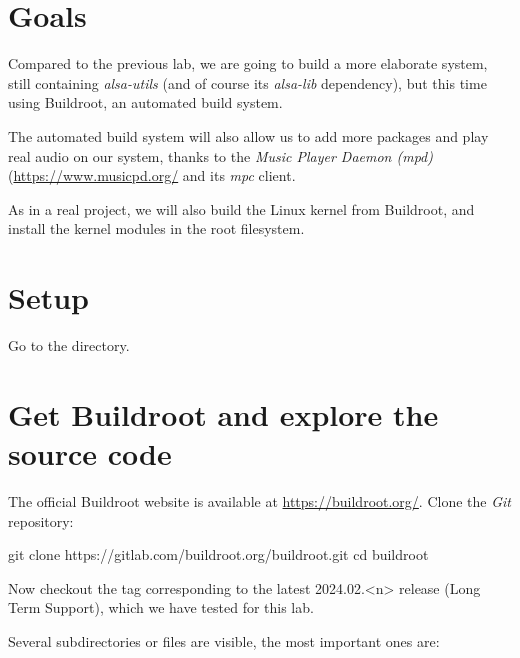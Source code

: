 
\section{Goals}

Compared to the previous lab, we are going to build a more elaborate
system, still containing {\em alsa-utils} (and of course its {\em
alsa-lib} dependency), but this time using Buildroot,
an automated build system.

The automated build system will also allow us to add more packages
and play real audio on our system, thanks to the {\em Music Player
Daemon (mpd)} (\url{https://www.musicpd.org/} and its {\em mpc} client.

As in a real project, we will also build the Linux kernel from
Buildroot, and install the kernel modules in the root filesystem.

\section{Setup}

Go to the  directory.

\section{Get Buildroot and explore the source code}

The official Buildroot website is available at
\url{https://buildroot.org/}. Clone the {\em Git} repository:

\begin{bashinput}
git clone https://gitlab.com/buildroot.org/buildroot.git
cd buildroot
\end{bashinput}

Now checkout the tag corresponding to the latest 2024.02.<n> release (Long
Term Support), which we have tested for this lab.

Several subdirectories or files are visible, the most important ones
are:

